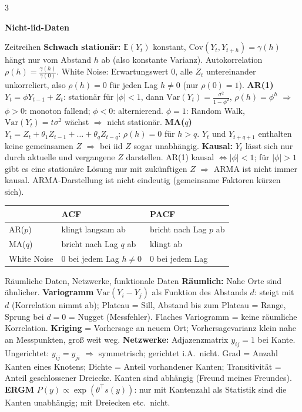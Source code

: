 \documentclass[8pt,a4paper,landscape]{extarticle}
\renewcommand{\arraystretch}{1.12}
\newcommand{\sect}[1]{\par\vspace{1pt}%
  {\fontsize{10}{11}\selectfont\bfseries #1}\par\nobreak\vspace{1pt}\nobreak}
\newcommand{\E}{\mathbb{E}}
\newcommand{\V}{\mathrm{Var}}
\newcommand{\Cov}{\mathrm{Cov}}
\newcommand{\ra}{$\Rightarrow$}
\begin{document}
\begin{multicols*}{3}
\sect{Nicht-iid-Daten}
\begin{wissen}{Zeitreihen}
\textbf{Schwach stationär:} $\E(Y_t)$ konstant, $\Cov(Y_t,Y_{t+h})=\gamma(h)$ hängt nur vom Abstand $h$ ab (also konstante Varianz). Autokorrelation $\rho(h)=\frac{\gamma(h)}{\gamma(0)}$. White Noise: Erwartungswert 0, alle $Z_t$ untereinander unkorreliert, also $\rho(h)=0$ für jeden Lag $h\neq 0$ (nur $\rho(0)=1$).
\textbf{AR(1)} $Y_t=\phi Y_{t-1}+Z_t$: stationär für $|\phi|<1$, dann $\V(Y_t)=\frac{\sigma^2}{1-\phi^2}$, $\rho(h)=\phi^h$ \ra{} $\phi>0$: monoton fallend; $\phi<0$: alternierend. $\phi=1$: Random Walk, $\V(Y_t)=t\sigma^2$ wächst \ra{} nicht stationär.
\textbf{MA($q$)} $Y_t=Z_t+\theta_1Z_{t-1}+\dots+\theta_qZ_{t-q}$: $\rho(h)=0$ für $h>q$. $Y_t$ und $Y_{t+q+1}$ enthalten keine gemeinsamen $Z$ \ra{} bei iid $Z$ sogar unabhängig.
\textbf{Kausal:} $Y_t$ lässt sich nur durch aktuelle und vergangene $Z$ darstellen. AR(1) kausal $\Leftrightarrow|\phi|<1$; für $|\phi|>1$ gibt es eine stationäre Lösung nur mit zukünftigen $Z$ \ra{} ARMA ist nicht immer kausal. ARMA-Darstellung ist nicht eindeutig (gemeinsame Faktoren kürzen sich).
{\renewcommand{\arraystretch}{1.1}\begin{tabularx}{\linewidth}{@{}lXX@{}}
 & ACF & PACF \\
\hline
AR($p$) & klingt langsam ab & bricht nach Lag $p$ ab \\
MA($q$) & bricht nach Lag $q$ ab & klingt ab \\
White Noise & $0$ bei jedem Lag $h\neq 0$ & $0$ bei jedem Lag \\
\end{tabularx}}
\end{wissen}
\begin{wissen}{Räumliche Daten, Netzwerke, funktionale Daten}
\textbf{Räumlich:} Nahe Orte sind ähnlicher. \textbf{Variogramm} $\V(Y_i-Y_j)$ als Funktion des Abstands $d$: steigt mit $d$ (Korrelation nimmt ab); Plateau = Sill, Abstand bis zum Plateau = Range, Sprung bei $d=0$ = Nugget (Messfehler). Flaches Variogramm = keine räumliche Korrelation. \textbf{Kriging} = Vorhersage an neuem Ort; Vorhersagevarianz klein nahe an Messpunkten, groß weit weg.
\textbf{Netzwerke:} Adjazenzmatrix $y_{ij}=1$ bei Kante. Ungerichtet: $y_{ij}=y_{ji}$ \ra{} symmetrisch; gerichtet i.A.\ nicht. Grad = Anzahl Kanten eines Knotens; Dichte = Anteil vorhandener Kanten; Transitivität = Anteil geschlossener Dreiecke. Kanten sind abhängig (Freund meines Freundes). \textbf{ERGM} $P(y)\propto\exp(\theta^\top s(y))$: nur mit Kantenzahl als Statistik sind die Kanten unabhängig; mit Dreiecken etc.\ nicht.

\end{wissen}
\end{multicols*}
\end{document}
